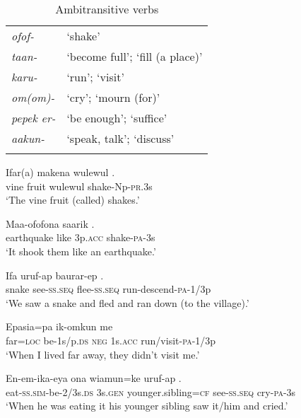 \begin{table}
\caption{Ambitransitive verbs}
\label{tab:3:ambitransitives}
 
\begin{tabular}{>{\itshape}ll}
\mytoprule
ofof- &`shake'\\
taan- &`become full'; `fill (a place)'\\
karu- &`run'; `visit'\\
om(om)- &`cry'; `mourn (for)'\\
pepek er- &`be enough'; `suffice'\\
aakun- &`speak, talk'; `discuss'\\
\mybottomrule
\end{tabular}

\end{table}

\ea%
\label{ex:3:x1827}
\gll Ifar(a) makena wulewul . \\
vine fruit wulewul shake-Np-\textsc{pr}.3s\\
\glt`The vine fruit (called)  shakes.'
\z

\ea%
\label{ex:3:x1826}
\gll Maa-ofofona saarik  . \\
earthquake like 3p.\textsc{acc} shake-\textsc{pa}-3s\\
\glt`It shook them like an earthquake.'
\z

\ea%
\label{ex:3:x304}
\gll Ifa uruf-ap baurar-ep . \\
snake see-\textsc{ss}.\textsc{seq} flee-\textsc{ss}.\textsc{seq} run-descend-\textsc{pa}-1/3p \\
\glt`We saw a snake and fled and ran down (to the village).'
\z

\ea%
\label{ex:3:x305}
\gll Epasia=pa ik-omkun me   \\
far=\textsc{loc} be-1s/p.\textsc{ds} \textsc{neg} 1s.\textsc{acc} run/visit-\textsc{pa}-1/3p\\
\glt`When I lived far away, they didn't visit me.'
\z

\ea%
\label{ex:3:x1059}
\gll En-em-ika-eya ona wiamun=ke uruf-ap .\\
eat-\textsc{ss}.\textsc{sim}-be-2/3s.\textsc{ds} 3s.\textsc{gen} younger.sibling=\textsc{cf} see-\textsc{ss}.\textsc{seq} cry-\textsc{pa}-3s\\
\glt`When he was eating it his younger sibling saw it/him and cried.'
\z

